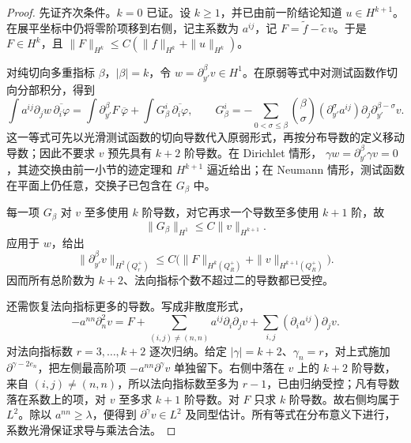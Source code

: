 \begin{proof}
	先证齐次条件。\(k=0\) 已证。设 \(k\ge1\)，并已由前一阶结论知道
	\(u\in H^{k+1}\)。在展平坐标中仍将零阶项移到右侧，记主系数为 \(a^{ij}\)，记 \(F=\widetilde f-\widetilde c\,v\)。于是 \(F\in H^k\)，且
	\(\|F\|_{H^k}\le C(\|f\|_{H^k}+\|u\|_{H^k})\)。

	对纯切向多重指标 \(\beta\)，\(|\beta|=k\)，令 \(w=\partial_{y'}^\beta v\in H^1\)。在原弱等式中对测试函数作切向分部积分，得到
	\begin{equation}\label{g3:eq:boundary-tangential-commutator}
	\int a^{ij}\partial_jw\,\overline{\partial_i\varphi}
	=\int\partial_{y'}^\beta F\,\overline\varphi
								+\int G_\beta^i\,\overline{\partial_i\varphi},
	\qquad
	G_\beta^i=
	-\sum_{0<\sigma\le\beta}\binom\beta\sigma
			(\partial_{y'}^\sigma a^{ij})
							\partial_j\partial_{y'}^{\beta-\sigma}v.
	\end{equation}
	这一等式可先以光滑测试函数的切向导数代入原弱形式，再按分布导数的定义移动导数；因此不要求 \(v\) 预先具有 \(k+2\) 阶导数。在 Dirichlet 情形，
	\(\gamma w=\partial_{y'}^\beta\gamma v=0\)，其迹交换由前一小节的迹定理和 \(H^{k+1}\) 逼近给出；在 Neumann 情形，测试函数在平面上仍任意，交换子已包含在 \(G_\beta\) 中。

	每一项 \(G_\beta\) 对 \(v\) 至多使用 \(k\) 阶导数，对它再求一个导数至多使用 \(k+1\) 阶，故
	\[
	\|G_\beta\|_{H^1}\le C\|v\|_{H^{k+1}}.
	\]
	应用于 \(w\)，给出
	\[
	\|\partial_{y'}^\beta v\|_{H^2(Q_r^+)}
	\le C\bigl(\|F\|_{H^k(Q_R^+)}
																									+\|v\|_{H^{k+1}(Q_R^+)}\bigr).
	\]
	因而所有总阶数为 \(k+2\)、法向指标个数不超过二的导数都已受控。

	还需恢复法向指标更多的导数。写成非散度形式，
	\begin{equation}\label{g3:eq:normal-high-derivative-recovery}
	-a^{nn}\partial_n^2v
	=F+\sum_{(i,j)\ne(n,n)}a^{ij}\partial_i\partial_jv
							+\sum_{i,j}(\partial_i a^{ij})\partial_jv.
	\end{equation}
	对法向指标数 \(r=3,\ldots,k+2\) 逐次归纳。给定 \(|\gamma|=k+2\)、\(\gamma_n=r\)，对上式施加 \(\partial^{\gamma-2e_n}\)，把左侧最高阶项
	\(-a^{nn}\partial^\gamma v\) 单独留下。右侧中落在 \(v\) 上的 \(k+2\) 阶导数，来自 \((i,j)\ne(n,n)\)，所以法向指标数至多为 \(r-1\)，已由归纳受控；凡有导数落在系数上的项，对 \(v\) 至多求 \(k+1\) 阶导数。对 \(F\) 只求 \(k\) 阶导数。故右侧均属于 \(L^2\)。除以 \(a^{nn}\ge\lambda\)，便得到 \(\partial^\gamma v\in L^2\) 及同型估计。所有等式在分布意义下进行，系数光滑保证求导与乘法合法。


\end{proof}
